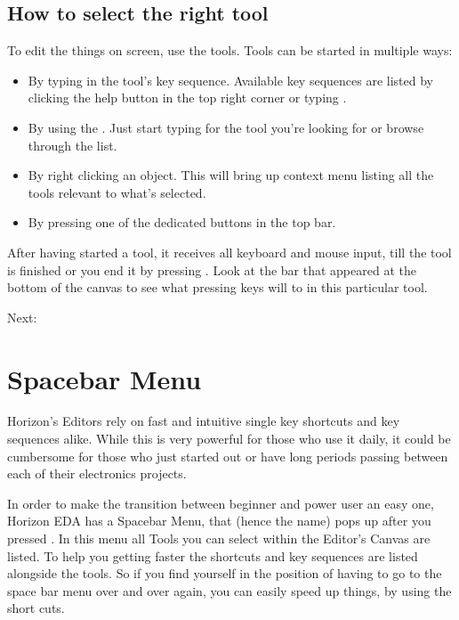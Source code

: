 \documentclass[letterpaper,10pt,czech]{sphinxmanual}
\begin{document}
\section{How to select the right tool}
\label{\detokenize{tools:how-to-select-the-right-tool}}
To edit the things on screen, use the tools. Tools can be started in
multiple ways:
\begin{itemize}
\item {} 
By typing in the tool’s key sequence. Available key sequences are
listed by clicking the help button in the top right corner or typing
.

\item {} 
By using the {\hyperref[\detokenize{spacebar-menu::doc}]{}}.
Just start typing for the tool you’re looking for or browse through
the list.

\item {} 
By right clicking an object. This will bring up context menu listing
all the tools relevant to what’s selected.

\item {} 
By pressing one of the dedicated buttons in the top bar.

\end{itemize}

After having started a tool, it receives all keyboard and mouse input, till the tool is finished or you end it by pressing .
Look at the bar that appeared at the bottom of the canvas to see what
pressing keys will to in this particular tool.

Next: {\hyperref[\detokenize{spacebar-menu::doc}]{}}


\chapter{Spacebar Menu}
\label{\detokenize{spacebar-menu:spacebar-menu}}\label{\detokenize{spacebar-menu::doc}}
Horizon’s Editors rely on fast and intuitive single key shortcuts and key sequences alike. While this is very powerful for those who use it daily, it could be cumbersome for those who just started out or have long periods passing between each of their electronics projects.

\noindent{}

In order to make the transition between beginner and power user an easy one, Horizon EDA has a Spacebar Menu, that (hence the name) pops up after you pressed . In this menu all Tools you can select within the Editor’s Canvas are listed. To help you getting faster the shortcuts and key sequences are listed alongside the tools. So if you find yourself in the position of having to go to the space bar menu over and over again, you can easily speed up things, by using the short cuts.
\end{document}
